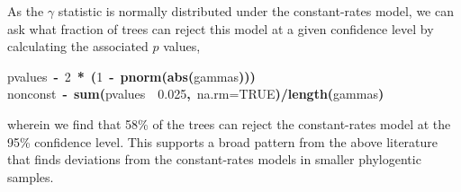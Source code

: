 \documentclass[authoryear, preprint]{elsarticle}
\makeatletter
\newcommand{\hlnumber}[1]{\textcolor[rgb]{0,0,0}{#1}}%
\newcommand{\hlfunctioncall}[1]{\textcolor[rgb]{.5,0,.33}{\textbf{#1}}}%
\newcommand{\hlkeyword}[1]{\textbf{#1}}%
\newcommand{\hlargument}[1]{\textcolor[rgb]{.69,.25,.02}{#1}}%
\newcommand{\hlassignement}[1]{\textbf{#1}}%
\newcommand{\hlsymbol}[1]{#1}%
\newcommand{\hlstd}[1]{\textcolor[rgb]{0,0,0}{#1}}%
\newenvironment{kframe}{%
 \def\FrameCommand##1{\hskip\@totalleftmargin \hskip-\fboxsep
 \colorbox{shadecolor}{##1}\hskip-\fboxsep
     \hskip-\linewidth \hskip-\@totalleftmargin \hskip\columnwidth}%
 \MakeFramed {\advance\hsize-\width
   \@totalleftmargin\z@ \linewidth\hsize
   \@setminipage}}%
 {\par\unskip\endMakeFramed}
\newenvironment{knitrout}{}{} %
\makeatother
\begin{document}
As the $\gamma$ statistic is normally distributed under the constant-rates model, 
we can ask what fraction of trees can reject this model at a given confidence
level by calculating the associated $p$ values,
\begin{knitrout}
\color{fgcolor}\begin{kframe}
\begin{flushleft}
\ttfamily\noindent
\hlsymbol{p\usebox{\hlnormalsizeboxunderscore}values}{\ }\hlassignement{\usebox{\hlnormalsizeboxlessthan}-}{\ }\hlnumber{2}{\ }\hlkeyword{*}{\ }\hlkeyword{(}\hlnumber{1}{\ }\hlkeyword{-}{\ }\hlfunctioncall{pnorm}\hlkeyword{(}\hlfunctioncall{abs}\hlkeyword{(}\hlsymbol{gammas}\hlkeyword{)}\hlkeyword{)}\hlkeyword{)}\hspace*{\fill}\\
\hlstd{}\hlsymbol{non\usebox{\hlnormalsizeboxunderscore}const}{\ }\hlassignement{\usebox{\hlnormalsizeboxlessthan}-}{\ }\hlfunctioncall{sum}\hlkeyword{(}\hlsymbol{p\usebox{\hlnormalsizeboxunderscore}values}{\ }\hlkeyword{\usebox{\hlnormalsizeboxlessthan}}{\ }\hlnumber{0.025}\hlkeyword{,}{\ }\hlargument{na.rm}\hlargument{=}\hlnumber{TRUE}\hlkeyword{)}\hlkeyword{/}\hlfunctioncall{length}\hlkeyword{(}\hlsymbol{gammas}\hlkeyword{)}\mbox{}
\normalfont
\end{flushleft}
\end{kframe}
\end{knitrout}

wherein we find that 58\% of the trees can reject the constant-rates model at the 95\% confidence level. 
This supports a broad pattern from the above literature that finds deviations from the constant-rates models in smaller phylogentic samples.  
\end{document}

